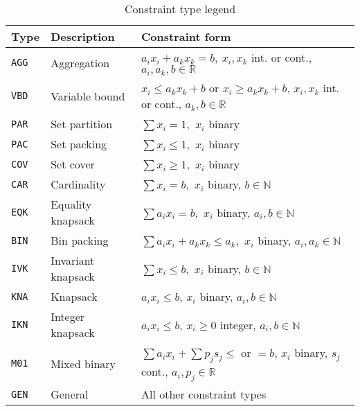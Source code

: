 \begin{table}[H]
	\centering
	\caption{Constraint type legend \cite{MIPLIB}}
	\label{table:constraint_type}
	\begin{tabular}{@{}lll@{}}
		\toprule
		Type           & Description        & Constraint form                                                                                           \\ \midrule
		\texttt{AGG} & Aggregation        & $a_i x_i+a_k x_k=b,\ x_i , x_k$ int. or cont., $a_i , a_k , b \in \mathbb{R}$                  \\
		\texttt{VBD} & Variable bound     & $x_i \le a_k x_k + b$ or $x_i\ge a_k x_k + b$, $x_i, x_k$ int. or cont., $a_k, b\in\mathbb{R}$ \\
		\texttt{PAR} & Set partition      & $\sum x_i = 1,$ $x_i$ binary                                                                   \\
		\texttt{PAC} & Set packing        & $\sum x_i \le 1,$ $x_i$ binary                                                                 \\
		\texttt{COV} & Set cover          & $\sum x_i \ge 1,$ $x_i$ binary                                                                 \\
		\texttt{CAR} & Cardinality        & $\sum x_i = b,$ $x_i$ binary, $b\in\mathbb{N}$                                                 \\
		\texttt{EQK} & Equality knapsack  & $\sum a_i x_i = b,$ $x_i$ binary, $a_i , b\in\mathbb{N}$                                       \\
		\texttt{BIN} & Bin packing        & $\sum a_i x_i  + a_k x_k \le a_k,$ $x_i$ binary, $a_i , a_k\in\mathbb{N}$                      \\
		\texttt{IVK} & Invariant knapsack & $\sum x_i \le b,$ $x_i$ binary, $b\in\mathbb{N}$                                               \\
		\texttt{KNA} & Knapsack           & $a_i x_i \le b$, $x_i$ binary, $a_i,b\in\mathbb{N}$                                            \\
		\texttt{IKN} & Integer knapsack   & $a_i x_i \le b$, $x_i\ge 0$ integer, $a_i,b\in\mathbb{N}$                                      \\
		\texttt{M01} & Mixed binary       & $\sum a_i x_i + \sum p_j s_j \le$ or $=b$, $x_i$ binary, $s_j$ cont., $a_i, p_j\in\mathbb{R}$  \\
		\texttt{GEN} & General            & All other constraint types                                                                     \\ \bottomrule
	\end{tabular}
\end{table}

